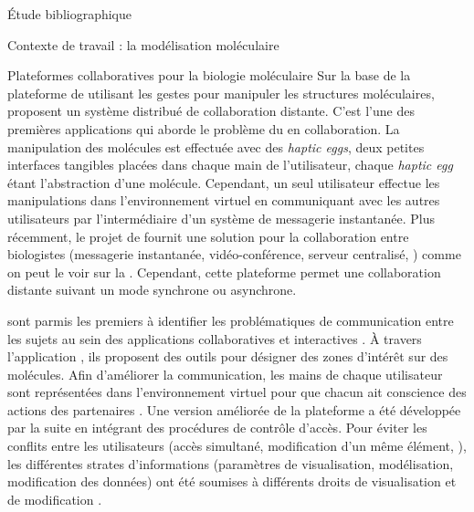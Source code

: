 \documentclass[myfrancais,ngerman,english,french]{mythesis}
\begin{document}
\begin{mychapter}{Étude bibliographique}
\begin{mysection}{Contexte de travail : la modélisation moléculaire}
\begin{mysubsection}{Plateformes collaboratives pour la biologie moléculaire}
				Sur la base de la plateforme de  utilisant les gestes pour manipuler les structures moléculaires,  proposent un système distribué de collaboration distante.
				C'est l'une des premières applications qui aborde le problème du  en collaboration.
				La manipulation des molécules est effectuée avec des \textit{haptic eggs}, deux petites interfaces tangibles placées dans chaque main de l'utilisateur, chaque \textit{haptic egg} étant l'abstraction d'une molécule.
				Cependant, un seul utilisateur effectue les manipulations dans l'environnement virtuel en communiquant avec les autres utilisateurs par l'intermédiaire d'un système de messagerie instantanée.
				Plus récemment, le projet \myeMinerals de  fournit une solution pour la collaboration entre biologistes (messagerie instantanée, vidéo-conférence, serveur centralisé, \myetc) comme on peut le voir sur la .
				Cependant, cette plateforme permet une collaboration distante suivant un mode synchrone ou asynchrone.

				\begin{myfigure}
				\end{myfigure}

				 sont parmis les premiers à identifier les problématiques de communication entre les sujets au sein des applications collaboratives et interactives .
				À travers l'application \myAMMPVis, ils proposent des outils pour désigner des zones d'intérêt sur des molécules.
				Afin d'améliorer la communication, les mains de chaque utilisateur sont représentées dans l'environnement virtuel pour que chacun ait conscience des actions des partenaires .
				Une version améliorée \myAMMPEXTN de la plateforme a été développée par la suite en intégrant des procédures de contrôle d'accès.
				Pour éviter les conflits entre les utilisateurs (accès simultané, modification d'un même élément, \myetc), les différentes strates d'informations (paramètres de visualisation, modélisation, modification des données) ont été soumises à différents droits de visualisation et de modification .


\end{mysubsection}
\end{mysection}
\end{mychapter}
\end{document}
